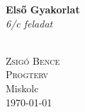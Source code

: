 \documentclass{book}
\begin{document}
\begin{titlepage}
\center
\null
\vspace{2.5cm}
\begin{Huge}
\textbf{Első Gyakorlat}\\
\textit{6/c feladat}
\end{Huge}
\\[5.5cm]
\LARGE
\textsc{Zsigó Bence\\Progterv}
\\[6cm]
\Large
\textsf{Miskolc}\\
\today

\end{titlepage}
\end{document}

